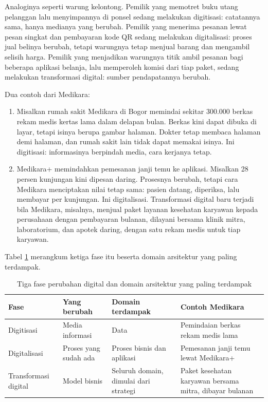 Analoginya seperti warung kelontong. Pemilik yang memotret buku utang pelanggan lalu
menyimpannya di ponsel sedang melakukan digitisasi: catatannya sama, hanya medianya yang
berubah. Pemilik yang menerima pesanan lewat pesan singkat dan pembayaran kode QR sedang
melakukan digitalisasi: proses jual belinya berubah, tetapi warungnya tetap menjual barang
dan mengambil selisih harga. Pemilik yang menjadikan warungnya titik ambil pesanan bagi
beberapa aplikasi belanja, lalu memperoleh komisi dari tiap paket, sedang melakukan
transformasi digital: sumber pendapatannya berubah.

Dua contoh dari Medikara:

\begin{enumerate}
  \item Misalkan rumah sakit Medikara di Bogor memindai sekitar 300.000 berkas rekam medis
        kertas lama dalam delapan bulan. Berkas kini dapat dibuka di layar, tetapi isinya
        berupa gambar halaman. Dokter tetap membaca halaman demi halaman, dan rumah sakit
        lain tidak dapat memakai isinya. Ini digitisasi: informasinya berpindah media, cara
        kerjanya tetap.
  \item Medikara+ memindahkan pemesanan janji temu ke aplikasi. Misalkan 28 persen
        kunjungan kini dipesan daring. Prosesnya berubah, tetapi cara Medikara
        menciptakan nilai tetap sama: pasien datang, diperiksa, lalu membayar per kunjungan.
        Ini digitalisasi. Transformasi digital baru terjadi bila Medikara, misalnya, menjual
        paket layanan kesehatan karyawan kepada perusahaan dengan pembayaran bulanan, dilayani
        bersama klinik mitra, laboratorium, dan apotek daring, dengan satu rekam medis untuk
        tiap karyawan.
\end{enumerate}

Tabel \ref{tab:ch08-tiga-istilah} merangkum ketiga fase itu beserta domain arsitektur yang
paling terdampak.

\begin{table}[!htb]
  \centering
  \caption{Tiga fase perubahan digital dan domain arsitektur yang paling terdampak}
  \label{tab:ch08-tiga-istilah}
  \begin{tabularx}{\textwidth}{>{\raggedright\arraybackslash}p{2.0cm}>{\raggedright\arraybackslash}p{2.5cm}>{\raggedright\arraybackslash}p{2.7cm}>{\raggedright\arraybackslash}X}
    \hline
    \textbf{Fase} & \textbf{Yang berubah} & \textbf{Domain terdampak} &
      \textbf{Contoh Medikara} \\
    \hline
    Digitisasi & Media informasi & Data & Pemindaian berkas rekam medis lama \\
    \hline
    Digitalisasi & Proses yang sudah ada & Proses bisnis dan aplikasi & Pemesanan janji
      temu lewat Medikara+ \\
    \hline
    Trans\-for\-masi digital & Model bisnis & Seluruh domain, dimulai dari strategi & Paket
      kesehatan karyawan bersama mitra, dibayar bulanan \\
    \hline
  \end{tabularx}
\end{table}

